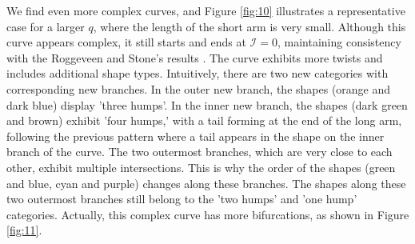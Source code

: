 \documentclass[12pt,MSc,twoside]{muthesis_2020}
\begin{document}
We find even more complex curves, and Figure \ref{fig:10} illustrates a representative case for a larger $q$, where the length of the short arm is very small. Although this curve appears complex, it still starts and ends at $\mathcal{I}=0$, maintaining consistency with the Roggeveen and Stone's results \cite{roggeveen2022motion}. The curve exhibits more twists and includes additional shape types. Intuitively, there are two new categories with corresponding new branches. In the outer new branch, the shapes (orange and dark blue) display 'three humps'. In the inner new branch, the shapes (dark green and brown) exhibit 'four humps,' with a tail forming at the end of the long arm, following the previous pattern where a tail appears in the shape on the inner branch of the curve. The two outermost branches, which are very close to each other, exhibit multiple intersections. This is why the order of the shapes (green and blue, cyan and purple) changes along these branches. The shapes along these two outermost branches still belong to the 'two humps' and 'one hump' categories. Actually, this complex curve has more bifurcations, as shown in Figure \ref{fig:11}.
\end{document}
